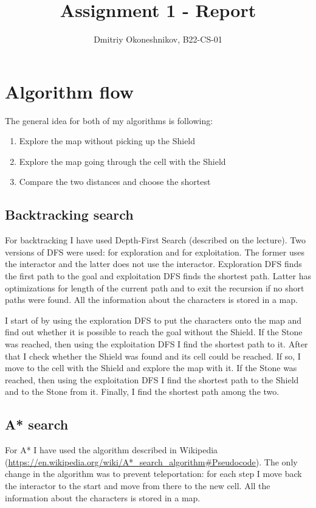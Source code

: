 \documentclass{article}
\title{Assignment 1 - Report}
\author{Dmitriy Okoneshnikov, B22-CS-01}
\begin{document}
\maketitle

\tableofcontents
\newpage

\section{Algorithm flow}
The general idea for both of my algorithms is following:
\begin{enumerate}
    \item Explore the map without picking up the Shield
    \item Explore the map going through the cell with the Shield
    \item Compare the two distances and choose the shortest
\end{enumerate}
\subsection{Backtracking search}
For backtracking I have used Depth-First Search (described on the lecture). Two versions of DFS were used: for exploration and for exploitation.
The former uses the interactor and the latter does not use the interactor. Exploration DFS finds the first path to the goal and exploitation DFS finds the shortest path.
Latter has optimizations for length of the current path and to exit the recursion if no short paths were found.
All the information about the characters is stored in a map.

I start of by using the exploration DFS to put the characters onto the map and find out whether it is possible to reach the goal without the Shield.
If the Stone was reached, then using the exploitation DFS I find the shortest path to it.
After that I check whether the Shield was found and its cell could be reached. If so, I move to the cell with the Shield and explore the map with it. 
If the Stone was reached, then using the exploitation DFS I find the shortest path to the Shield and to the Stone from it.
Finally, I find the shortest path among the two.
\subsection{A* search}
For A* I have used the algorithm described in Wikipedia (\url{https://en.wikipedia.org/wiki/A*_search_algorithm#Pseudocode}). The only change in the algorithm was to prevent teleportation: for each step I move back the interactor to the start and move from there to the new cell.
All the information about the characters is stored in a map.
\end{document}
